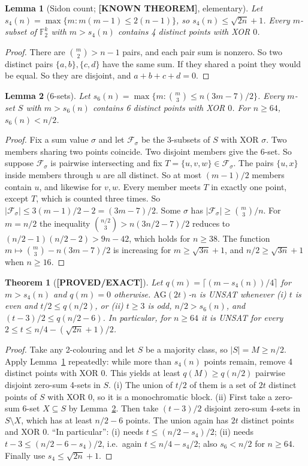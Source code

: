 \documentclass[11pt]{article}
\newtheorem{lemma}{Lemma}
\newtheorem{theorem}{Theorem}
\theoremstyle{definition}
\theoremstyle{remark}
\newcommand{\lab}[1]{\textbf{[#1]}}
\newcommand{\F}{\mathbb{F}}
\newcommand{\AG}{\mathrm{AG}}
\begin{document}
\begin{lemma}[Sidon count; \lab{KNOWN THEOREM}, elementary]\label{lem:sidon}
Let $s_4(n)=\max\{m:m(m-1)\le 2(n-1)\}$, so $s_4(n)\le\sqrt{2n}+1$. Every $m$-subset of
$\F_2^k$ with $m>s_4(n)$ contains 4 distinct points with XOR $0$.
\end{lemma}
\begin{proof}
There are $\binom m2>n-1$ pairs, and each pair sum is nonzero. So two distinct pairs
$\{a,b\},\{c,d\}$ have the same sum. If they shared a point they would be equal. So they are
disjoint, and $a+b+c+d=0$.
\end{proof}

\begin{lemma}[6-sets]\label{lem:six}
Let $s_6(n)=\max\{m:\binom m3\le n(3m-7)/2\}$. Every $m$-set $S$ with $m>s_6(n)$ contains 6
distinct points with XOR $0$. For $n\ge 64$, $s_6(n)<n/2$.
\end{lemma}
\begin{proof}
Fix a sum value $\sigma$ and let $\mathcal F_\sigma$ be the 3-subsets of $S$ with XOR
$\sigma$. Two members sharing two points coincide. Two disjoint members give the 6-set. So
suppose $\mathcal F_\sigma$ is pairwise intersecting and fix $T=\{u,v,w\}\in\mathcal F_\sigma$.
The pairs $\{u,x\}$ inside members through $u$ are all distinct. So at most $(m-1)/2$ members
contain $u$, and likewise for $v,w$. Every member meets $T$ in exactly one point, except $T$,
which is counted three times. So $|\mathcal F_\sigma|\le 3(m-1)/2-2=(3m-7)/2$. Some $\sigma$
has $|\mathcal F_\sigma|\ge\binom m3/n$. For $m=n/2$ the inequality
$\binom{n/2}{3}>n(3n/2-7)/2$ reduces to $(n/2-1)(n/2-2)>9n-42$, which holds for $n\ge 38$.
The function $m\mapsto\binom m3-n(3m-7)/2$ is increasing for $m\ge\sqrt{3n}+1$, and
$n/2\ge\sqrt{3n}+1$ when $n\ge 16$.
\end{proof}

\begin{theorem}[\lab{PROVED/EXACT}]\label{thm:linear}
Let $q(m)=\lceil (m-s_4(n))/4\rceil$ for $m>s_4(n)$ and $q(m)=0$ otherwise. $\AG(2t)$-$n$ is
UNSAT whenever
(i) $t$ is even and $t/2\le q(n/2)$, or
(ii) $t\ge3$ is odd, $n/2>s_6(n)$, and $(t-3)/2\le q(n/2-6)$.
In particular, for $n\ge 64$ it is UNSAT for every $2\le t\le n/4-(\sqrt{2n}+1)/2$.
\end{theorem}
\begin{proof}
Take any 2-colouring and let $S$ be a majority class, so $|S|=M\ge n/2$. Apply
Lemma~\ref{lem:sidon} repeatedly: while more than $s_4(n)$ points remain, remove 4 distinct
points with XOR $0$. This yields at least $q(M)\ge q(n/2)$ pairwise disjoint zero-sum
4-sets in $S$. (i) The union of $t/2$ of them is a set of $2t$ distinct points of $S$ with
XOR $0$, so it is a monochromatic block. (ii) First take a zero-sum 6-set $X\subseteq S$ by
Lemma~\ref{lem:six}. Then take $(t-3)/2$ disjoint zero-sum 4-sets in $S\setminus X$, which
has at least $n/2-6$ points. The union again has $2t$ distinct points and XOR $0$.
``In particular'': (i) needs $t\le (n/2-s_4)/2$; (ii) needs $t-3\le (n/2-6-s_4)/2$, i.e.\
again $t\le n/4-s_4/2$; also $s_6<n/2$ for $n\ge64$. Finally use
$s_4\le\sqrt{2n}+1$.
\end{proof}
\end{document}

